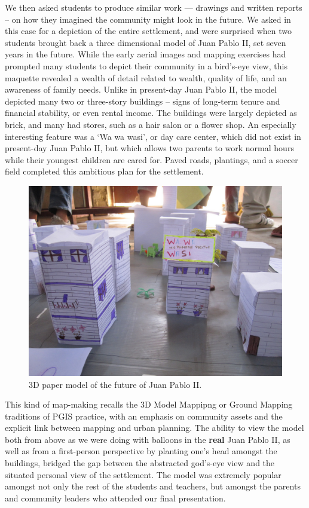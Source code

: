 \documentclass[11pt,oneside,notitlepage]{report}
\begin{document}
We then asked students to produce similar work --- drawings and written reports -- on how they imagined the community might look in the future. We asked in this case for a depiction of the entire settlement, and were surprised when two students brought back a three dimensional model of Juan Pablo II, set seven years in the future. While the early aerial images and mapping exercises had prompted many students to depict their community in a bird's-eye view, this maquette revealed a wealth of detail related to wealth, quality of life, and an awareness of family needs. Unlike in present-day Juan Pablo II, the model depicted many two or three-story buildings -- signs of long-term tenure and financial stability, or even rental income. The buildings were largely depicted as brick, and many had stores, such as a hair salon or a flower shop. An especially interesting feature was a `Wa wa wasi', or day care center, which did not exist in present-day Juan Pablo II, but which allows two parents to work normal hours while their youngest children are cared for. Paved roads, plantings, and a soccer field completed this ambitious plan for the settlement.

\begin{figure}[h]
  \begin{center}
	\includegraphics[width=1\textwidth]{images/juan-pablo-maqueta.jpg}
	\caption{3D paper model of the future of Juan Pablo II.}
  \end{center}
\end{figure}

This kind of map-making recalls the 3D Model Mappipng or Ground Mapping traditions of PGIS practice, with an emphasis on community assets and the explicit link between mapping and urban planning. The ability to view the model both from above as we were doing with balloons in the \textbf{real} Juan Pablo II, as well as from a first-person perspective by planting one's head amongst the buildings, bridged the gap between the abstracted god's-eye view and the situated personal view of the settlement. The model was extremely popular amongst not only the rest of the students and teachers, but amongst the parents and community leaders who attended our final presentation. 
\end{document}
